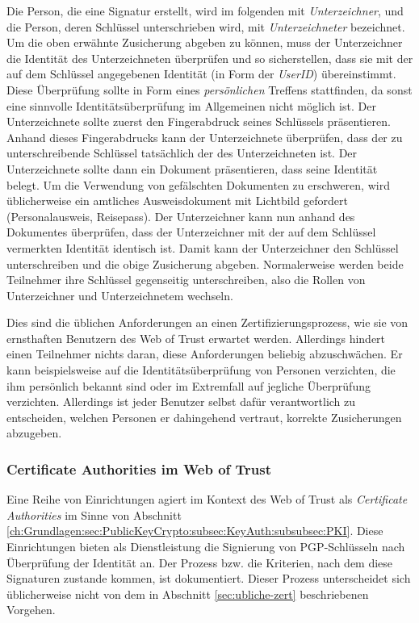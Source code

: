 Die Person, die eine Signatur erstellt, wird im folgenden mit
\emph{Unterzeichner}, und die Person, deren Schlüssel
unterschrieben wird, mit \emph{Unterzeichneter} bezeichnet. Um
die oben erwähnte Zusicherung abgeben zu können, muss der
Unterzeichner die Identität des Unterzeichneten überprüfen und
so sicherstellen, dass sie mit der auf dem Schlüssel angegebenen
Identität (in Form der \emph{UserID}) übereinstimmt. Diese
Überprüfung sollte in Form eines \emph{persönlichen} Treffens
stattfinden, da sonst eine sinnvolle Identitätsüberprüfung im
Allgemeinen nicht möglich ist. Der Unterzeichnete sollte zuerst den
Fingerabdruck seines Schlüssels präsentieren. Anhand dieses
Fingerabdrucks kann der Unterzeichnete überprüfen, dass der zu
unterschreibende Schlüssel tatsächlich der des Unterzeichneten
ist.  Der Unterzeichnete sollte dann ein Dokument präsentieren, dass
seine Identität belegt. Um die Verwendung von gefälschten
Dokumenten zu erschweren, wird üblicherweise ein amtliches
Ausweisdokument mit Lichtbild gefordert (Personalausweis,
Reisepass). Der Unterzeichner kann nun anhand des Dokumentes
überprüfen, dass der Unterzeichner mit der auf dem Schlüssel
vermerkten Identität identisch ist. Damit kann der Unterzeichner den
Schlüssel unterschreiben und die obige Zusicherung
abgeben. Normalerweise werden beide Teilnehmer ihre Schlüssel
gegenseitig unterschreiben, also die Rollen von Unterzeichner und
Unterzeichnetem wechseln.

Dies sind die üblichen Anforderungen an einen
Zertifizierungsprozess, wie sie von ernsthaften Benutzern des Web of
Trust erwartet werden. Allerdings hindert einen Teilnehmer nichts
daran, diese Anforderungen beliebig abzuschwächen. Er kann
beispielsweise auf die Identitätsüberprüfung von Personen
verzichten, die ihm persönlich bekannt sind oder im Extremfall auf
jegliche Überprüfung verzichten. Allerdings ist jeder Benutzer
selbst dafür verantwortlich zu entscheiden, welchen Personen er
dahingehend vertraut, korrekte Zusicherungen abzugeben.

\subsubsection{Certificate Authorities im Web of Trust}
\label{sec:cert-auth-im}

Eine Reihe von Einrichtungen agiert im Kontext des Web of Trust als
\emph{Certificate Authorities} im Sinne von Abschnitt
\ref{ch:Grundlagen:sec:PublicKeyCrypto:subsec:KeyAuth:subsubsec:PKI}. Diese
Einrichtungen bieten als Dienstleistung die Signierung von
PGP-Schlüsseln nach Überprüfung der Identität an. Der Prozess
bzw. die Kriterien, nach dem diese Signaturen zustande kommen, ist
dokumentiert. Dieser Prozess unterscheidet sich üblicherweise nicht
von dem in Abschnitt \ref{sec:ubliche-zert} beschriebenen Vorgehen.

